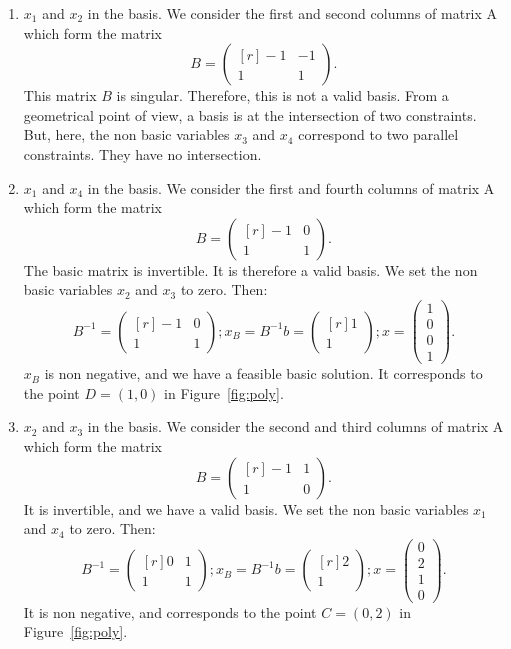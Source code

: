 \begin{enumerate}
\begin{enumerate}
\item $x_1$ and $x_2$ in the basis. We consider the first and second columns of matrix A which form the matrix 
$$B = \begin{pmatrix*}[r]
-1&-1\\
1&1
\end{pmatrix*}.$$
This matrix $B$ is singular. Therefore, this is not a valid
basis. From a geometrical point of view, a basis is at the
intersection of two constraints. But, here, the non basic variables
$x_3$ and $x_4$ correspond to  two parallel
constraints. They have no intersection.

\item $x_1$ and $x_4$ in the basis. We consider the first and fourth columns of matrix A which form the matrix
$$B = \begin{pmatrix*}[r]
-1&0\\
1&1
\end{pmatrix*}.$$
  The basic matrix is invertible. It is therefore a valid basis.  
We set the non basic  variables $x_2$ and $x_3$ to zero. Then: 
$$
B^{-1} =
\begin{pmatrix*}[r]
-1&0\\
1&1
\end{pmatrix*}
;
x_B=B^{-1}b=
\begin{pmatrix*}[r]
1\\
1
\end{pmatrix*}
;
x
=
\begin{pmatrix}
1\\
0\\
0\\
1
\end{pmatrix}.
$$
$x_B$ is non negative, and we have a feasible basic solution. It
corresponds to the point $D=(1,0)$ in Figure~\ref{fig:poly}.

\item $x_2$ and $x_3$ in the basis. We consider the second and third columns of matrix A which form the matrix 
$$B = \begin{pmatrix*}[r]
-1&1\\
1&0
\end{pmatrix*}.$$
  It is invertible, and we have a valid basis. 
We set the non basic variables $x_1$ and $x_4$ to zero. Then: 
$$
B^{-1} =
\begin{pmatrix*}[r]
0&1\\
1&1
\end{pmatrix*}
;
x_B=B^{-1}b=
\begin{pmatrix*}[r]
2\\
1
\end{pmatrix*}
;
x
=
\begin{pmatrix}
0\\
2\\
1\\
0
\end{pmatrix}.
$$
It is non negative, and corresponds to the point $C=(0,2)$ in Figure~\ref{fig:poly}. 



\end{enumerate}
\end{enumerate}
